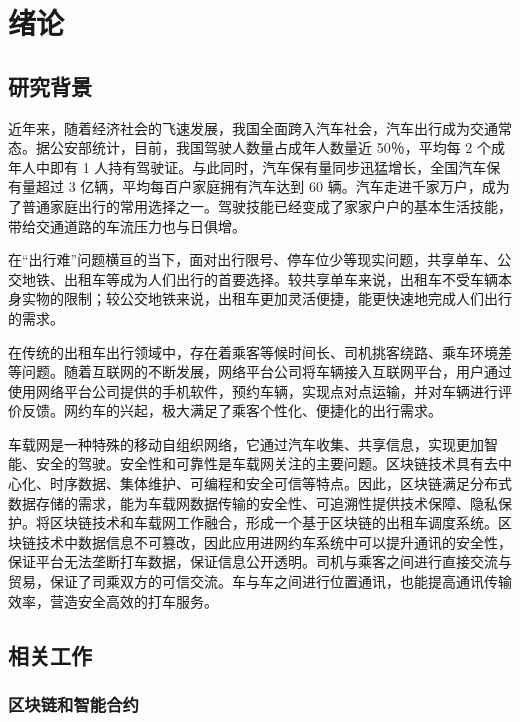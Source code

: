 \chapter{绪论}

\section{研究背景}

\space 近年来，随着经济社会的飞速发展，我国全面跨入汽车社会，汽车出行成为交通常态。据公安部统计，目前，我国驾驶人数量占成年人数量近 50％，平均每 2 个成年人中即有 1 人持有驾驶证。与此同时，汽车保有量同步迅猛增长，全国汽车保有量超过 3 亿辆，平均每百户家庭拥有汽车达到 60 辆\cite{驾驶人数据}。汽车走进千家万户，成为了普通家庭出行的常用选择之一。驾驶技能已经变成了家家户户的基本生活技能，带给交通道路的车流压力也与日俱增。

\space 在``出行难”问题横亘的当下，面对出行限号、停车位少等现实问题，共享单车、公交地铁、出租车等成为人们出行的首要选择。较共享单车来说，出租车不受车辆本身实物的限制；较公交地铁来说，出租车更加灵活便捷，能更快速地完成人们出行的需求。

\space 在传统的出租车出行领域中，存在着乘客等候时间长、司机挑客绕路、乘车环境差等问题\cite{赵杨2022网约车冲击下出租车行业转型对策研究}。随着互联网的不断发展，网络平台公司将车辆接入互联网平台，用户通过使用网络平台公司提供的手机软件，预约车辆，实现点对点运输，并对车辆进行评价反馈。网约车的兴起，极大满足了乘客个性化、便捷化的出行需求。

\space 车载网是一种特殊的移动自组织网络，它通过汽车收集、共享信息，实现更加智能、安全的驾驶\cite{程刚2011车联网现状与发展研究}。安全性和可靠性是车载网关注的主要问题\cite{Zhaojun2018A}。区块链技术具有去中心化、时序数据、集体维护、可编程和安全可信等特点\cite{袁勇2016区块链技术发展现状与展望}。因此，区块链满足分布式数据存储的需求，能为车载网数据传输的安全性、可追溯性提供技术保障、隐私保护。将区块链技术和车载网工作融合，形成一个基于区块链的出租车调度系统。区块链技术中数据信息不可篡改，因此应用进网约车系统中可以提升通讯的安全性，保证平台无法垄断打车数据，保证信息公开透明。司机与乘客之间进行直接交流与贸易，保证了司乘双方的可信交流。车与车之间进行位置通讯，也能提高通讯传输效率，营造安全高效的打车服务。

\section{相关工作}

\subsection{区块链和智能合约}

